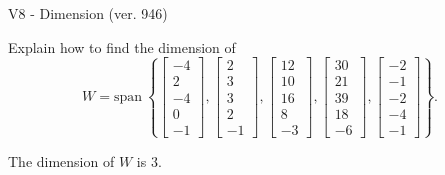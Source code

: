 \begin{exercise}
  \begin{exerciseTitle}V8 - Dimension (ver. 946)\end{exerciseTitle}
  \begin{exerciseStatement}
    Explain how to find the dimension of 
\[W=\mathrm{span}\ \left\{\left[\begin{array}{r}
-4 \\
2 \\
-4 \\
0 \\
-1
\end{array}\right] , \left[\begin{array}{r}
2 \\
3 \\
3 \\
2 \\
-1
\end{array}\right] , \left[\begin{array}{r}
12 \\
10 \\
16 \\
8 \\
-3
\end{array}\right] , \left[\begin{array}{r}
30 \\
21 \\
39 \\
18 \\
-6
\end{array}\right] , \left[\begin{array}{r}
-2 \\
-1 \\
-2 \\
-4 \\
-1
\end{array}\right]\right\}.\]



  \end{exerciseStatement}
  \begin{exerciseAnswer}
   The dimension of \(W\) is  \(3\).
  


  \end{exerciseAnswer}
\end{exercise}